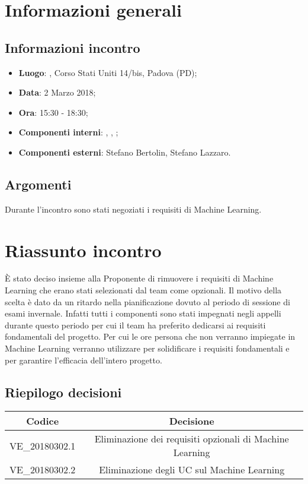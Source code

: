 \section{Informazioni generali}

\subsection{Informazioni incontro}
\begin{itemize}
\item \textbf{Luogo}: \Proponente{}, Corso Stati Uniti 14/bis, Padova (PD);
\item \textbf{Data}: 2 Marzo 2018;
\item \textbf{Ora}: 15:30 - 18:30;
\item \textbf{Componenti interni}: \Tommaso, \Mattia, \Isacco;
\item \textbf{Componenti esterni}: Stefano Bertolin, Stefano Lazzaro.
\end{itemize}

\subsection{Argomenti}
Durante l'incontro sono stati negoziati i requisiti di Machine Learning.

\section{Riassunto incontro}
È stato deciso insieme alla Proponente di rimuovere i requisiti di Machine Learning che erano stati selezionati dal team come opzionali. Il motivo della scelta è dato da un ritardo nella pianificazione dovuto al periodo di sessione di esami invernale. Infatti tutti i componenti sono stati impegnati negli appelli durante questo periodo per cui il team ha preferito dedicarsi ai requisiti fondamentali del progetto. Per cui le ore persona che non verranno impiegate in Machine Learning verranno utilizzare per solidificare i requisiti fondamentali e per garantire l'efficacia dell'intero progetto.

\subsection{Riepilogo decisioni}
\begin{center}
    \begin{tabular}{c | c}
        \centering
        \rowcolor[gray]{.9} { \textbf{Codice} } & { \textbf{Decisione} } \\ 
        \hline
        \rowcolor[gray]{.8} VE\_20180302.1 & Eliminazione dei requisiti opzionali di Machine Learning \\
        \rowcolor[gray]{.9} VE\_20180302.2 & Eliminazione degli UC sul Machine Learning \\
    \end{tabular}
\end{center}
